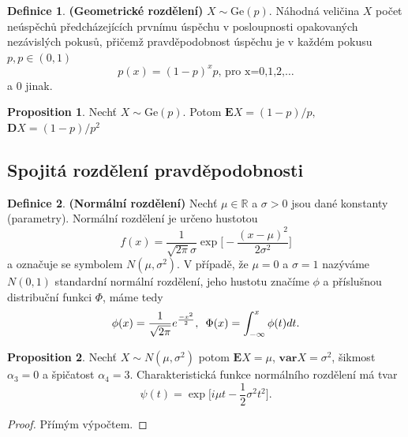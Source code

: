 \documentclass[a4]{report}
\theoremstyle{definition}
\newtheorem{definition}{Definice}[section]
\newtheorem{proposition}{Proposition}[section]
\begin{document}
{\begin{definition}{\textbf{(Geometrické rozdělení)}}
$X\sim \mathrm{Ge}(p)$. Náhodná veličina $X$ počet neúspěchů předcházejících prvnímu úspěchu v posloupnosti opakovaných nezávislých pokusů, přičemž pravděpodobnost úspěchu je v každém pokusu $p, p\in (0,1)$
\begin{equation}
p(x)=(1-p)^xp \text{,    pro x=0,1,2,\ldots}
\end{equation}
 a $0$ jinak.
\end{definition}

\begin{proposition}
Nechť $X \sim \mathrm{Ge}(p)$. Potom $\mathbf{E}X =(1-p)/p,$ $\mathbf{D}X = (1-p)/p^2$ 
\end{proposition}




\subsection{Spojitá rozdělení pravděpodobnosti}
\begin{definition}{\textbf{(Normální rozdělení)}}
Nechť $ \mu \in \mathbb{R}$ a $\sigma > 0$ jsou dané konstanty (parametry). Normální rozdělení je určeno hustotou
\begin{equation}
f(x) = \frac{1}{\sqrt{2\pi}\sigma}\exp \bigg[ -\frac{(x - \mu)^{2}}{2\sigma^{2}} \bigg]
\end{equation}
a označuje se symbolem $N(\mu, \sigma^{2}).$ V případě, že $\mu = 0$ a $\sigma = 1$ nazýváme $N(0, 1)$ standardní normální rozdělení, jeho hustotu značíme $\phi$ a příslušnou distribuční funkci $\Phi$, máme tedy
\begin{equation}
\phi(x) = \frac{1}{\sqrt{2\pi}}e^{\frac{-x^{2}}{2}}, \enskip \Phi(x) = \int_{-\infty}^{x}\phi(t)dt.
\end{equation}
\end{definition}

\begin{proposition}
Nechť $X \sim N(\mu, \sigma^{2})$ potom $\mathbf{E}X = \mu$, $\mathbf{var}X = \sigma^{2}$, šikmost $\alpha_{3} = 0$ a špičatost $\alpha_{4} = 3$. Charakteristická funkce normálního rozdělení má tvar 
\begin{equation}
\psi(t) = \exp\bigg[ i\mu t - \frac{1}{2}\sigma^{2}t^{2} \bigg].
\end{equation}
\end{proposition}
\begin{proof}
Přímým výpočtem.
\end{proof}

}
\end{document}
